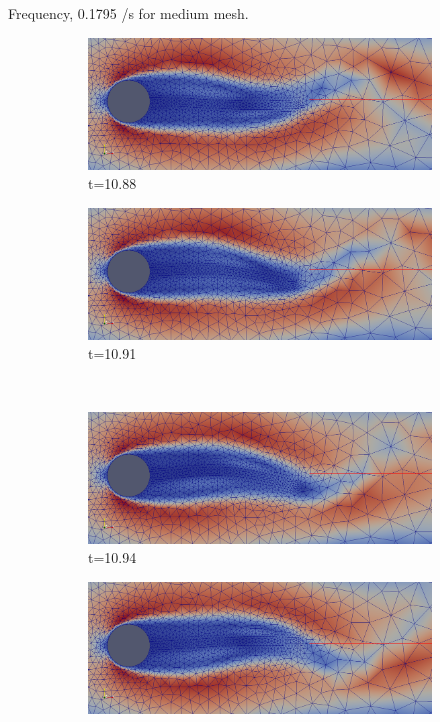 Frequency, 0.1795 /s for medium mesh.
\begin{center}
\begin{figure}[!ht]
\begin{subfigure}[b]{0.5\linewidth}
\includegraphics[width=\linewidth]{figures/FSI3/coarse/FSI_mesh_1}
\caption{t=10.88}
\end{subfigure}
\begin{subfigure}[b]{0.5\linewidth}
\includegraphics[width=\linewidth]{figures/FSI3/coarse/FSI_mesh_2}
\caption{t=10.91}
\end{subfigure} \\
\begin{subfigure}[b]{0.5\linewidth}
\includegraphics[width=\linewidth]{figures/FSI3/coarse/FSI_mesh_3}
\caption{t=10.94}
\end{subfigure}
\begin{subfigure}[b]{0.5\linewidth}
\includegraphics[width=\linewidth]{figures/FSI3/coarse/FSI_mesh_4}

\end{subfigure}
\end{figure}
\end{center}
